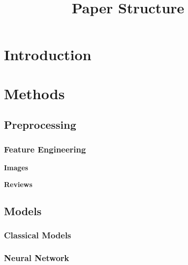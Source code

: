 \documentclass[12pt, letterpaper]{article}
\title{Paper Structure}
\author{}
\date{}
\begin{document}
\maketitle
\tableofcontents
\setcounter{tocdepth}{3}


\section{Introduction} %


\section{Methods} %


\subsection{Preprocessing} %

\subsubsection{Feature Engineering} %

\textbf{Images} %

\textbf{Reviews} %


\subsection{Models} %

\subsubsection{Classical Models} %

\subsubsection{Neural Network} %
\end{document}
